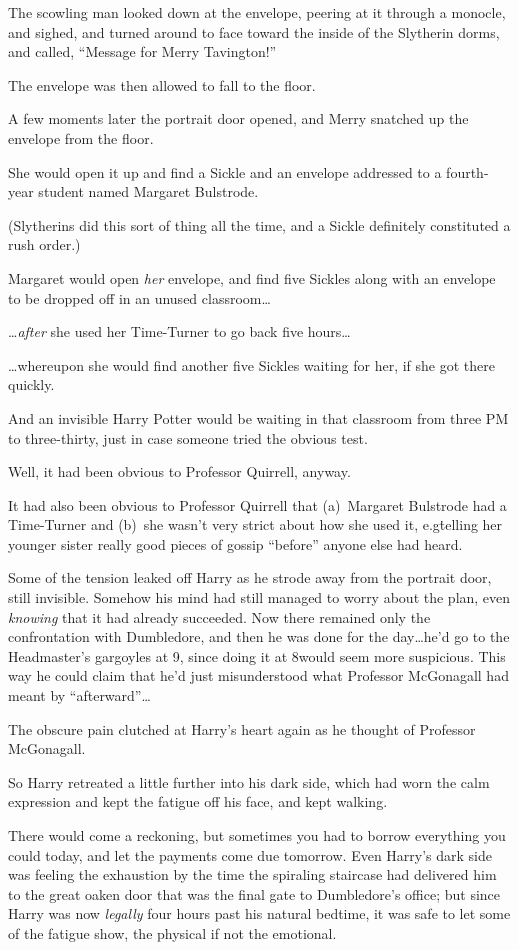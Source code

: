 The scowling man looked down at the envelope, peering at it through a monocle,
and sighed, and turned around to face toward the inside of the Slytherin dorms,
and called, “Message for Merry Tavington!”

The envelope was then allowed to fall to the floor.

A few moments later the portrait door opened, and Merry snatched up the
envelope from the floor.

She would open it up and find a Sickle and an envelope addressed to a
fourth-year student named Margaret Bulstrode.

(Slytherins did this sort of thing all the time, and a Sickle definitely
constituted a rush order.)

Margaret would open \emph{her} envelope, and find five Sickles along with an
envelope to be dropped off in an unused classroom…

…\emph{after} she used her Time-Turner to go back five hours…

…whereupon she would find another five Sickles waiting for her, if she
got there quickly.

And an invisible Harry Potter would be waiting in that classroom from three PM
to three-thirty, just in case someone tried the obvious test.

Well, it had been obvious to Professor Quirrell, anyway.

It had also been obvious to Professor Quirrell that (a)~Margaret Bulstrode had
a Time-Turner and (b)~she wasn’t very strict about how she used it, e.g\.
telling her younger sister really good pieces of gossip “before” anyone else
had heard.

Some of the tension leaked off Harry as he strode away from the portrait door,
still invisible. Somehow his mind had still managed to worry about the plan,
even \emph{knowing} that it had already succeeded. Now there remained only the
confrontation with Dumbledore, and then he was done for the day…he’d go
to the Headmaster’s gargoyles at 9\PM, since doing it at 8\PM would seem more
suspicious. This way he could claim that he’d just misunderstood what Professor
McGonagall had meant by “afterward”…

The obscure pain clutched at Harry’s heart again as he thought of Professor
McGonagall.

So Harry retreated a little further into his dark side, which had worn the calm
expression and kept the fatigue off his face, and kept walking.

There would come a reckoning, but sometimes you had to borrow everything you
could today, and let the payments come due tomorrow.
\later
Even Harry’s dark side was feeling the exhaustion by the time the spiraling
staircase had delivered him to the great oaken door that was the final gate to
Dumbledore’s office; but since Harry was now \emph{legally} four hours past his
natural bedtime, it was safe to let some of the fatigue show, the physical if
not the emotional.

